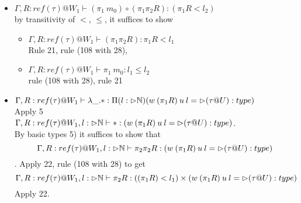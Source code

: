 \message{ !name(paper.tex)}\documentclass{article}
\begin{document}
\begin{itemize}
\begin{itemize}
    \item $\Gamma, R: ref(\tau) @ W_1 \vdash (\pi_1\: m_0) \circ (\pi_1 \pi_2 R) : (\pi_1 R < l_2)$\\
    by transitivity of $<$, $\leq$, it suffices to show
    \begin{itemize}
        \item $\Gamma, R: ref(\tau) @ W_1 \vdash (\pi_1 \pi_2 R): \pi_1 R < l_1$\\
        Rule 21, rule (108 with 28), 
        \item $\Gamma, R: ref(\tau) @ W_1 \vdash \pi_1\: m_0: l_1 \leq l_2$\\
        rule (108 with 28), rule 21
    \end{itemize}
    \item $\Gamma, R: ref(\tau) @ W_1 \vdash \lambda \_. * : \Pi(l: \rhd \mathbb{N})(w \: (\pi_1 R) \: u \: l = \rhd (\tau @ U) : type)$\\
    Apply 5\\
     $\Gamma, R: ref(\tau) @ W_1, l : \rhd \mathbb{N} \vdash  * :(w \: (\pi_1 R) \: u \: l = \rhd (\tau @ U) : type)$.\\
     By basic types 5) it suffices to show that 
     \[\Gamma, R: ref(\tau) @ W_1, l : \rhd \mathbb{N} \vdash  \pi_2 \pi_2 R :(w \: (\pi_1 R) \: u \: l = \rhd (\tau @ U) : type)\]. 
     Apply 22, rule (108 with 28) to get
     \[\Gamma, R: ref(\tau) @ W_1, l : \rhd \mathbb{N} \vdash \pi_2 R :((\pi_1 R) < l_1) \times (w \: (\pi_1 R) \: u \: l = \rhd (\tau @ U) : type)\]
     Apply 22.

\end{itemize}
\end{itemize}
\end{document}
